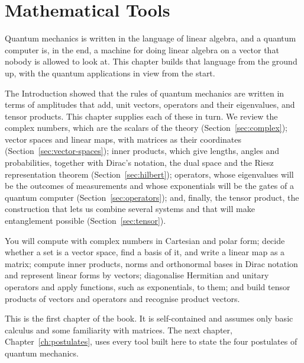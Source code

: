 \chapter{Mathematical Tools}\label{ch:tools}

Quantum mechanics is written in the language of linear algebra, and a quantum
computer is, in the end, a machine for doing linear algebra on a vector that
nobody is allowed to look at. This chapter builds that language from the
ground up, with the quantum applications in view from the start.

The Introduction showed that the rules of quantum mechanics are written in
terms of amplitudes that add, unit vectors, operators and their eigenvalues,
and tensor products. This chapter supplies each of these in turn. We review the
complex numbers, which are the scalars of the theory
(Section~\ref{sec:complex}); vector spaces and linear maps, with matrices as
their coordinates (Section~\ref{sec:vector-spaces}); inner products, which
give lengths, angles and probabilities, together with Dirac's notation, the
dual space and the Riesz representation theorem (Section~\ref{sec:hilbert});
operators, whose eigenvalues will be the outcomes of measurements and whose
exponentials will be the gates of a quantum computer
(Section~\ref{sec:operators}); and, finally, the tensor product, the
construction that lets us combine several systems and that will make
entanglement possible (Section~\ref{sec:tensor}).

\begin{objectives}
  You will compute with complex numbers in Cartesian and polar
  form; decide whether a set is a vector space, find a basis of it, and write a
  linear map as a matrix; compute inner products, norms and orthonormal bases
  in Dirac notation and represent linear forms by vectors; diagonalise
  Hermitian and unitary operators and apply functions, such as exponentials, to
  them; and build tensor products of vectors and operators and recognise
  product vectors.
\end{objectives}

\begin{whereitsits}
  This is the first chapter of the book. It is self-contained and assumes only
  basic calculus and some familiarity with matrices. The next chapter,
  Chapter~\ref{ch:postulates}, uses every tool built here to state the four
  postulates of quantum mechanics.
\end{whereitsits}







